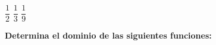 \documentclass[11pt, addpoints, answers]{exam}
\begin{document}
\begin{questions}
\begin{oneparcheckboxes}
	\choice $\dfrac{1}{2}$ 
	\choice $\dfrac{1}{3}$ 
	\choice $\dfrac{1}{9}$ 
\end{oneparcheckboxes}	

\question[1]\textbf{Determina el dominio de las siguientes funciones:	 } 

	\end{questions}
\end{document}
